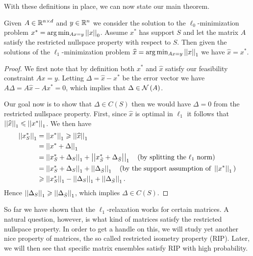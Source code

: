 \documentclass[11pt]{article}
\begin{document}
\begin{problem}
With these definitions in place, we can now state our main theorem.

\begin{theorem}
    Given \(A \in \mathbb R^{n\times d}\) and \(y\in\mathbb R^n\) we consider the solution to the \(\ell_0\)-minimization problem \(x^\ast=\arg\min_{A x=y}\left|\left|x\right|\right|_{0}\). Assume \(x^\ast\) has support \(S\) and let the matrix \(A\) satisfy the restricted nullspace property with respect to \(S\). Then given the solutions of the \(\ell_1\)-minimization problem \(\widehat{x}=\arg\min_{A x=y}\left|\left|x\right|\right|_{1}\) we have \(\widehat{x}=x^\ast\).
\end{theorem}

\begin{proof}
We first note that by definition both \(x^\ast\) and \(\widehat{x}\) satisfy our feasibility constraint \(A x=y\). Letting \(\Delta=\widehat{x}-x^\ast\) be the error vector we have \(A \Delta=A \widehat{x}-A x^\ast=0\), which implies that \(\Delta\in\mathcal N\left(A\right)\).

Our goal now is to show that \(\Delta\in C(S)\) then we would have \(\Delta=0\) from the restricted nullspace property. First, since \(\widehat{x}\) is optimal in \(\ell_1\) it follows that \(\left|\left|\widehat x\right|\right|_1\leqslant\left|\left|x^\ast\right|\right|_1\). We then have
\[\begin{aligned}
    \left|\left|x^\ast_S\right|\right|_1 &= \left|\left|x^\ast\right|\right|_1\geqslant \left|\left|\widehat x\right|\right|_1\\
    &= \left|\left|x^\ast+\Delta\right|\right|_1\\
    &= \left|\left|x^\ast_S+\Delta_S\right|\right|_1+\left|\left|x^\ast_{\bar S}+\Delta_{\bar S}\right|\right|_1\quad\textnormal{(by splitting the }\ell_1\textnormal{ norm)}\\
    &= \left|\left|x^\ast_S+\Delta_S\right|\right|_1+\left|\left|\Delta_{\bar S}\right|\right|_1\quad\textnormal{(by the support assumption of }\left|\left|x^\ast\right|\right|_1\textnormal{)}\\
    &\geqslant \left|\left|x^\ast_S\right|\right|_1-\left|\left|\Delta_S\right|\right|_1+\left|\left|\Delta_{\bar S}\right|\right|_1.
\end{aligned}\]
Hence \(\left|\left|\Delta_S\right|\right|_1\geqslant\left|\left|\Delta_{\bar S}\right|\right|_1\), which implies \(\Delta\in C(S)\).
\end{proof}

So far we have shown that the \(\ell_1\)-relaxation works for certain matrices. A natural question, however, is what kind of matrices satisfy the restricted nullspace property. In order to get a handle on this, we will study yet another nice property of matrices, the so called restricted isometry property (RIP). Later, we will then see that specific matrix ensembles satisfy RIP with high probability.


\end{problem}
\end{document}
